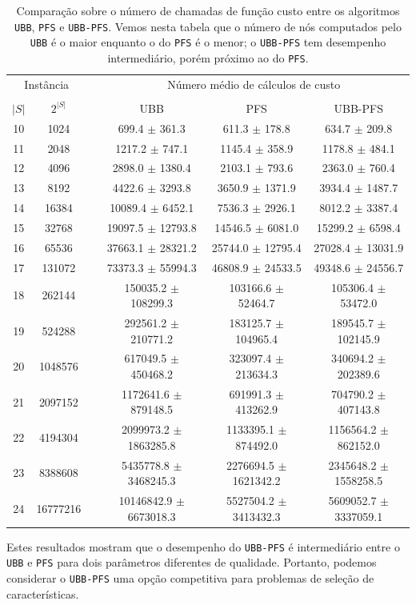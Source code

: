 \documentclass[12pt]{article}
\newcommand{\algname}[1]{\texttt{#1}}
\begin{document}
\begin{table}
\centering
\footnotesize
\caption{Comparação sobre o número de chamadas de função custo entre
os algoritmos \algname{UBB}, \algname{PFS} e \algname{UBB-PFS}. Vemos
nesta tabela que o número de nós computados pelo \algname{UBB} é o maior
enquanto o do \algname{PFS} é o menor; o \algname{UBB-PFS} tem 
desempenho intermediário, porém próximo ao do \algname{PFS}.}
\label{tab:ubbpfs_vs_ubb_vs_pfs_computed_nodes}
\begin{tabular}{cc c ccc}
\toprule
\multicolumn{2}{c}{Instância} & \phantom{} & \multicolumn{3}{c}{Número médio de cálculos de custo}\\
\cline{1-2}\cline{4-6} \\
$|S|$ & $2^{|S|}$ && UBB & PFS & UBB-PFS  \\
10 &    1024  && 699.4 $\pm$ 361.3 & 611.3 $\pm$ 178.8 & 634.7 $\pm$ 209.8 \\
11 &    2048  && 1217.2 $\pm$ 747.1 & 1145.4 $\pm$ 358.9 & 1178.8 $\pm$ 484.1 \\
12 &    4096  && 2898.0 $\pm$ 1380.4 & 2103.1 $\pm$ 793.6 & 2363.0 $\pm$ 760.4 \\
13 &    8192  && 4422.6 $\pm$ 3293.8 & 3650.9 $\pm$ 1371.9 & 3934.4 $\pm$ 1487.7 \\
14 &   16384  && 10089.4 $\pm$ 6452.1 & 7536.3 $\pm$ 2926.1 & 8012.2 $\pm$ 3387.4 \\
15 &   32768  && 19097.5 $\pm$ 12793.8 & 14546.5 $\pm$ 6081.0 & 15299.2 $\pm$ 6598.4 \\
16 &   65536  && 37663.1 $\pm$ 28321.2 & 25744.0 $\pm$ 12795.4 & 27028.4 $\pm$ 13031.9 \\
17 &  131072  && 73373.3 $\pm$ 55994.3 & 46808.9 $\pm$ 24533.5 & 49348.6 $\pm$ 24556.7 \\
18 &  262144  && 150035.2 $\pm$ 108299.3 & 103166.6 $\pm$ 52464.7 & 105306.4 $\pm$ 53472.0 \\
19 &  524288  && 292561.2 $\pm$ 210771.2 & 183125.7 $\pm$ 104965.4 & 189545.7 $\pm$ 102145.9 \\
20 & 1048576  && 617049.5 $\pm$ 450468.2 & 323097.4 $\pm$ 213634.3 & 340694.2 $\pm$ 202389.6 \\
21 & 2097152  && 1172641.6 $\pm$ 879148.5 & 691991.3 $\pm$ 413262.9 & 704790.2 $\pm$ 407143.8 \\
22 & 4194304  && 2099973.2 $\pm$ 1863285.8 & 1133395.1 $\pm$ 874492.0 & 1156564.2 $\pm$ 862152.0 \\
23 & 8388608  && 5435778.8 $\pm$ 3468245.3 & 2276694.5 $\pm$ 1621342.2 & 2345648.2 $\pm$ 1558258.5 \\
24 & 16777216 && 10146842.9 $\pm$ 6673018.3 & 5527504.2 $\pm$ 3413432.3 & 5609052.7 $\pm$ 3337059.1 \\
\bottomrule
\end{tabular}
\end{table}
Estes resultados mostram que o desempenho do \algname{UBB-PFS} é 
intermediário entre o \algname{UBB} e \algname{PFS} para dois parâmetros
diferentes de qualidade. Portanto, podemos considerar o 
\algname{UBB-PFS} uma opção competitiva para problemas de seleção de 
características.
\end{document}
